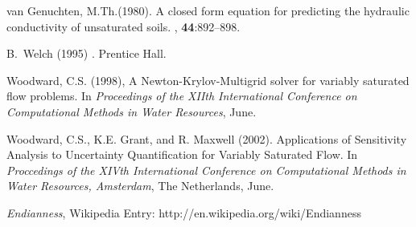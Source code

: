 \begin{thebibliography}{99}
{van Genuchten}, M.Th.(1980). 
\newblock A closed form equation for predicting the hydraulic conductivity of
  unsaturated soils.
, {\bf 44}:892--898.

B.~Welch (1995)
.
\newblock Prentice Hall.

Woodward, C.S. (1998),
\newblock A {N}ewton-{K}rylov-{M}ultigrid solver for variably saturated flow
  problems.
\newblock In {\em Proceedings of the XIIth International Conference on
  Computational Methods in Water Resources}, June.

Woodward, C.S., K.E. Grant, and R. Maxwell (2002). Applications of Sensitivity Analysis to Uncertainty Quantification for Variably Saturated Flow.
\newblock In {\em Proccedings of the XIVth International Conference on Computational Methods in Water Resources, Amsterdam}, The Netherlands, June.

{\em Endianness}, Wikipedia Entry: http://en.wikipedia.org/wiki/Endianness

\end{thebibliography}

